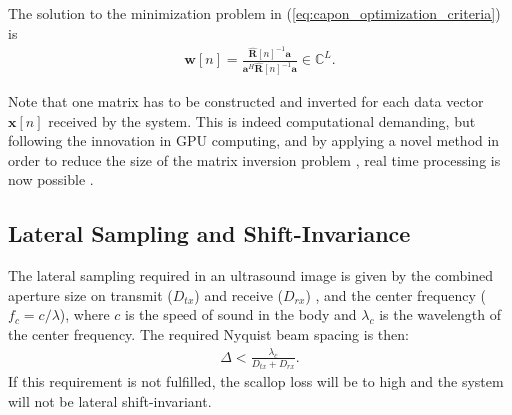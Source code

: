 \documentclass[journal]{IEEEtran}
\newcommand{\mat}[1]{\mathbf{#1}}
\renewcommand{\vec}[1]{\mathbf{#1}}
\begin{document}
The solution to the minimization problem in (\ref{eq:capon_optimization_criteria}) is
\begin{align}\label{eq:capon_weights}
\vec{w}[n] = \frac{\mat{\hat{R}}[n]^{-1}\vec{a}}{\vec{a}^H\mat{\hat{R}}[n]^{-1}\vec{a}} \in \mathbb{C}^L.
\end{align}

Note that one matrix has to be constructed and inverted for each data vector $\vec{x}[n]$ received by the system. This is indeed computational demanding, but following the innovation in GPU computing, and by applying a novel method in order to reduce the size of the matrix inversion problem \cite{Nilsen2009}, real time processing is now possible \cite{Asen}.


\subsection{Lateral Sampling and Shift-Invariance}

The lateral sampling required in an ultrasound image is given by the combined aperture size on transmit ($D_{tx}$) and receive ($D_{rx}$) \cite{Hergum2007}, and the center frequency ($f_c = c/\lambda$), where $c$ is the speed of sound in the body and $\lambda_c$ is the wavelength of the center frequency. The required Nyquist beam spacing is then:
\begin{align}
\Delta < \frac{\lambda_c}{D_{tx} + D_{rx}}. \label{eq:resolution}
\end{align}
If this requirement is not fulfilled, the scallop loss will be to high and the system will not be lateral shift-invariant.
\end{document}
